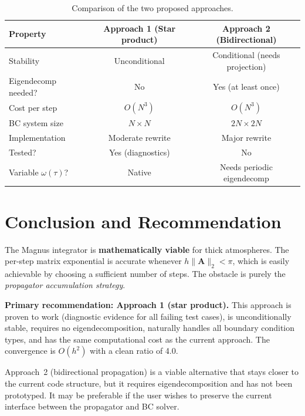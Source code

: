 \documentclass[11pt,a4paper]{article}
\newcommand{\mat}[1]{\mathbf{#1}}
\theoremstyle{definition}
\begin{document}
\begin{table}[h]\centering
\caption{Comparison of the two proposed approaches.}\label{tab:comparison}
\begin{tabular}{lcc}
\toprule
Property & Approach 1 (Star product) & Approach 2 (Bidirectional) \\
\midrule
Stability           & Unconditional       & Conditional (needs projection) \\
Eigendecomp needed? & No                  & Yes (at least once) \\
Cost per step       & $O(N^3)$            & $O(N^3)$ \\
BC system size      & $N\times N$         & $2N\times 2N$ \\
Implementation      & Moderate rewrite    & Major rewrite \\
Tested?             & Yes (diagnostics)   & No \\
Variable $\omega(\tau)$? & Native          & Needs periodic eigendecomp \\
\bottomrule
\end{tabular}
\end{table}


\section{Conclusion and Recommendation}

The Magnus integrator is \textbf{mathematically viable} for thick atmospheres.
The per-step matrix exponential is accurate whenever $h\|\mat{A}\|_2<\pi$,
which is easily achievable by choosing a sufficient number of steps.  The
obstacle is purely the \emph{propagator accumulation strategy}.

\textbf{Primary recommendation: Approach 1 (star product).}  This approach
is proven to work (diagnostic evidence for all failing test cases), is
unconditionally stable, requires no eigendecomposition, naturally handles
all boundary condition types, and has the same computational cost as the
current approach.  The convergence is $O(h^2)$ with a clean ratio of 4.0.

Approach~2 (bidirectional propagation) is a viable alternative that stays
closer to the current code structure, but it requires eigendecomposition
and has not been prototyped.  It may be preferable if the user wishes to
preserve the current interface between the propagator and BC solver.
\end{document}
